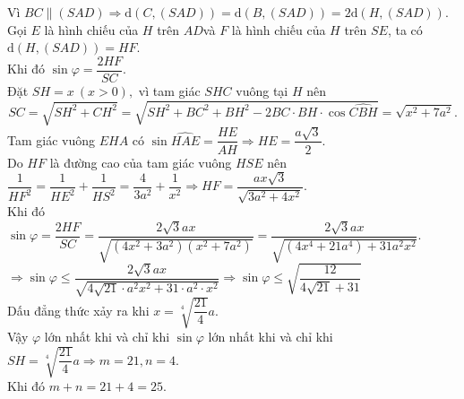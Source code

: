 \begin{vd}
{		Vì $BC \parallel(SAD)\Rightarrow \mathrm{d}(C,(SAD))=\mathrm{d}(B,(SAD) )=2\mathrm{d}(H,(SAD))$.\\
		Gọi $E$ là hình chiếu của $H$ trên $AD$và $F$ là hình chiếu của $H$ trên $SE$,
		ta có $\mathrm{d}(H,(SAD) )=HF$.\\
		Khi đó $\sin \varphi =\dfrac {2HF}{SC}$.\\
		Đặt $SH=x~(x>0),$ vì tam giác $SHC$ vuông tại $H$ nên $$SC=\sqrt {SH^2+CH^2}=\sqrt {SH^2+BC^2+BH^2-2BC\cdot BH\cdot \cos\widehat{CBH}}=\sqrt {x^2+7a^2}.$$
		Tam giác vuông $EHA$ có $\sin \widehat{HAE}=\dfrac {HE}{AH}\Rightarrow HE=\dfrac {a\sqrt {3}}{2}$.\\
		Do $HF$ là đường cao của tam giác vuông $HSE$ nên $\dfrac {1}{HF^2}=\dfrac {1}{HE^2}+\dfrac {1}{HS^2}=\dfrac {4}{3a^2}+\dfrac {1}{x^2}\Rightarrow HF=\dfrac {ax\sqrt {3}}{\sqrt {3a^2+4x^2}}$.\\
		Khi đó
		$\sin \varphi =\dfrac {2HF}{SC}=\dfrac {2\sqrt {3}ax}{\sqrt {(4x^2+3a^2)(x^2+7a^2)}}=\dfrac {2\sqrt {3}ax}{\sqrt {(4x^4+21a^4)+31a^2x^2}}$.\\
		$\Rightarrow \sin \varphi \le \dfrac {2\sqrt {3}ax}{\sqrt {4\sqrt {21}\cdot a^2x^2+31\cdot a^2\cdot x^2}}\Rightarrow \sin \varphi \le \sqrt {\dfrac {12}{4\sqrt {21}+31}} $\\
		Dấu đẳng thức xảy ra khi $ x=\sqrt [4]{\dfrac {21}{4}}a$.\\
		Vậy $\varphi $ lớn nhất khi và chỉ khi $\sin \varphi $ lớn nhất khi và chỉ khi $SH=\sqrt [4]{\dfrac {21}{4}}a\Rightarrow m=21,n=4$.\\
		Khi đó $ m+n=21+4=25$.
	}
\end{vd}
